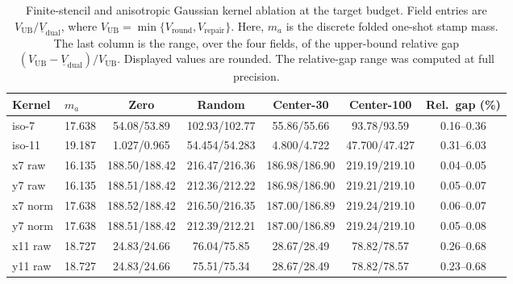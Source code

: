 \begin{table}[h]\centering\scriptsize\setlength{\tabcolsep}{1.5pt}
\caption{Finite-stencil and anisotropic Gaussian kernel
ablation at the target budget. Field entries are
$V_{\mathrm{UB}}/\underline V_{\mathrm{dual}}$, where
$V_{\mathrm{UB}}=\min\{V_{\mathrm{round}},V_{\mathrm{repair}}\}$. Here, $m_a$ is the
discrete folded one-shot stamp mass. The last column is the range, over the four
fields, of the upper-bound relative gap
$(V_{\mathrm{UB}}-\underline V_{\mathrm{dual}})/V_{\mathrm{UB}}$. Displayed values
are rounded. The relative-gap range was computed at full precision.}
\label{tab:kernel-ablation-si}
\begin{tabular}{llccccc}
\toprule
Kernel & $m_a$ & Zero & Random & Center-30 & Center-100 & Rel.\ gap (\%)\\
\midrule
iso-7  & 17.638 &  54.08/53.89 & 102.93/102.77 &  55.86/55.66 &  93.78/93.59 & 0.16--0.36\\
iso-11 & 19.187 & 1.027/0.965 & 54.454/54.283 & 4.800/4.722 & 47.700/47.427 & 0.31--6.03\\
x7 raw & 16.135 & 188.50/188.42 & 216.47/216.36 & 186.98/186.90 & 219.19/219.10 & 0.04--0.05\\
y7 raw & 16.135 & 188.51/188.42 & 212.36/212.22 & 186.98/186.90 & 219.21/219.10 & 0.05--0.07\\
x7 norm& 17.638 & 188.52/188.42 & 216.50/216.35 & 187.00/186.89 & 219.24/219.10 & 0.06--0.07\\
y7 norm& 17.638 & 188.51/188.42 & 212.39/212.21 & 187.00/186.89 & 219.24/219.10 & 0.05--0.08\\
x11 raw& 18.727 &  24.83/24.66 &  76.04/75.85 &  28.67/28.49 &  78.82/78.57 & 0.26--0.68\\
y11 raw& 18.727 &  24.83/24.66 &  75.51/75.34 &  28.67/28.49 &  78.82/78.57 & 0.23--0.68\\
\bottomrule
\end{tabular}
\end{table}

